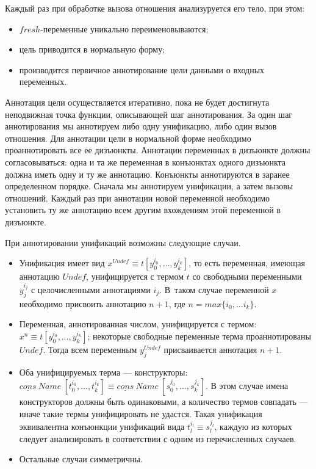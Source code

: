 \documentclass[conference,american,russian]{IEEEtran}
\begin{document}
Каждый раз при обработке вызова отношения анализуруется его тело, при этом: 
\begin{itemize}
    \item $fresh$-переменные уникально переименовываются;
    \item цель приводится в нормальную форму;
    \item производится первичное аннотирование цели данными о входных переменных.
\end{itemize}

Аннотация цели осуществляется итеративно, пока не будет достигнута неподвижная точка функции, описывающей шаг аннотирования. 
За один шаг аннотирования мы аннотируем либо одну унификацию, либо один вызов отношения. 
Для аннотации цели в нормальной форме необходимо проаннотировать все ее дизъюнкты. 
Аннотации переменных в дизъюнкте должны согласовываться: одна и та же переменная в конъюнктах одного дизъюнкта должна иметь одну и ту же аннотацию.
Конъюнкты аннотируются в заранее определенном порядке. 
Сначала мы аннотируем унификации, а затем вызовы отношений. 
Каждый раз при аннотации новой переменной необходимо установить ту же аннотацию всем другим вхождениям этой переменной в дизъюнкте. 

При аннотировании унификаций возможны следующие случаи. 
\begin{itemize}
    \item Унификация имеет вид $x^{Undef} \equiv t[y_0^{i_0}, \dots, y_k^{i_k}]$, то есть переменная, имеющая аннотацию $Undef$, унифицируется с термом $t$ со свободными переменными $y_j^{i_j}$ с целочисленными аннотациями $i_j$. В~таком случае переменной $x$ необходимо присвоить аннотацию $n + 1$, где $n = max \{ i_0, \dots i_k\}$.
    \item Переменная, аннотированная числом, унифицируется с термом: $x^{n} \equiv t[y_0^{i_0}, \dots, y_k^{i_k}]$; некоторые свободные переменные терма проаннотированы $Undef$.
    Тогда всем переменным $y_j^{Undef}$ присваивается аннотация $n+1$.
    \item Оба унифицируемых терма --- конструкторы: $\underline{cons} \ Name \ [t_0^{i_0}, \dots, t_k^{i_k}] \equiv \underline{cons} \ Name \ [s_0^{j_0}, \dots, s_k^{j_k}]$.
    В этом случае имена конструкторов должны быть одинаковыми, а количество термов совпадать --- иначе такие термы унифицировать не удастся.
    Такая унификация эквивалентна конъюнкции унификаций вида $t_l^{i_l} \equiv s_l^{j_l}$, каждую из которых следует анализировать в соответствии с одним из перечисленных случаев.  
    \item Остальные случаи симметричны.
\end{itemize}
\end{document}
